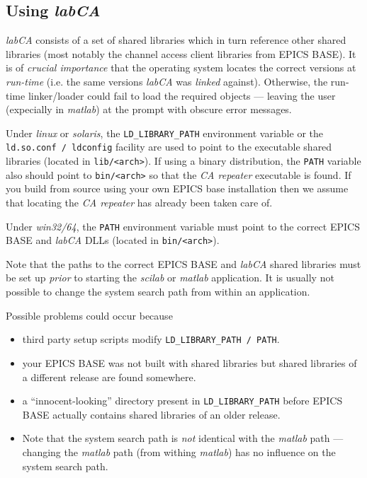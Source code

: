 \documentclass{article}
\newcommand{\sca}{\ita{labCA}}
\newcommand{\scilab}{\ita{scilab}}
\newcommand{\matlab}{\ita{matlab}}
\newcommand{\windoze}{\ita{win32/64}}
\newcommand{\com}[1]{{\tt #1}}
\newcommand{\pbrk}{\pagebreak[3]}
\newcommand{\ita}[1]{\emph{#1}}
\renewcommand{\pbrk}{}
\begin{document}
\pbrk
\subsection{Using \sca{}}
\label{usingsca}
\sca{} consists of a set of shared libraries which in turn reference
other shared libraries (most notably the channel access client libraries
from EPICS BASE). It is of \ita{crucial importance} that the operating
system locates the correct versions at \ita{run-time} (i.e. the same versions
\sca{} was \ita{linked} against). Otherwise, the run-time linker/loader
could fail to load the required objects --- leaving the user (expecially
in \matlab) at the prompt with obscure error messages.

Under \ita{linux} or \ita{solaris}, the \com{LD\_LIBRARY\_PATH} environment
variable or the \com{ld.so.conf / ldconfig} facility are used to point
to the executable shared libraries (located in \com{lib/<arch>}).
If using a binary distribution, the \com{PATH} variable also should point
to \com{bin/<arch>} so that the \ita{CA repeater} executable is found.
If you build from source using your own EPICS base installation then
we assume that locating the \ita{CA repeater} has already been taken
care of.

Under \windoze{}, the \com{PATH} environment variable must point to the
correct EPICS BASE and \sca{} DLLs (located in \com{bin/<arch>}).

Note that the paths to the correct EPICS BASE and \sca{} shared libraries
must be set up \ita{prior} to starting the \scilab{} or \matlab{} application.
It is usually not possible to change the system search
path from within an application.

Possible problems could occur because
\begin{itemize}
\item third party setup scripts modify \com{LD\_LIBRARY\_PATH / PATH}.
\item your EPICS BASE was not built with shared libraries but shared libraries
of a different release are found somewhere.
\item a ``innocent-looking'' directory present in \com{LD\_LIBRARY\_PATH}
before EPICS BASE actually contains shared libraries of an older release.
\item Note that the system search path is \ita{not} identical with the
\matlab{} path --- changing the \matlab{} path (from withing \matlab)
has no influence on the system search path.
\end{itemize}
\end{document}
